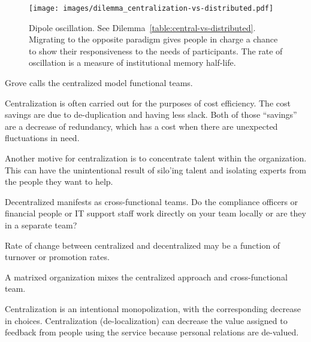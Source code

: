 \begin{figure}[H] %
    \centering
    \texttt{[image: images/dilemma\_centralization-vs-distributed.pdf]}
    \caption{Dipole oscillation. See Dilemma~\ref{table:central-vs-distributed}. Migrating to the opposite paradigm gives people in charge a chance to show their responsiveness to the needs of participants. The rate of oscillation is a measure of institutional memory half-life.}
    \label{fig:central-vs-distributed}
\end{figure}


Grove \cite{1995_Grove} calls the centralized model functional teams.

Centralization is often carried out for the purposes of cost efficiency. The cost savings are due to de-duplication and having less slack. Both of those ``savings'' are a decrease of redundancy, which has a cost when there are unexpected fluctuations in need. 

Another motive for centralization is to concentrate talent within the organization. This can have the unintentional result of silo'ing talent and isolating experts from the people they want to help.

Decentralized manifests as cross-functional teams. Do the compliance officers or financial people or IT support staff work directly on your team locally or are they in a separate team?

Rate of change between centralized and decentralized may be a function of turnover or promotion rates. 

A matrixed organization \cite{1985_NASA} mixes the centralized approach and cross-functional team.





Centralization is an intentional monopolization, with the corresponding decrease in choices. 
Centralization (de-localization) can decrease the value assigned to feedback from people using the service because personal relations are de-valued. 


